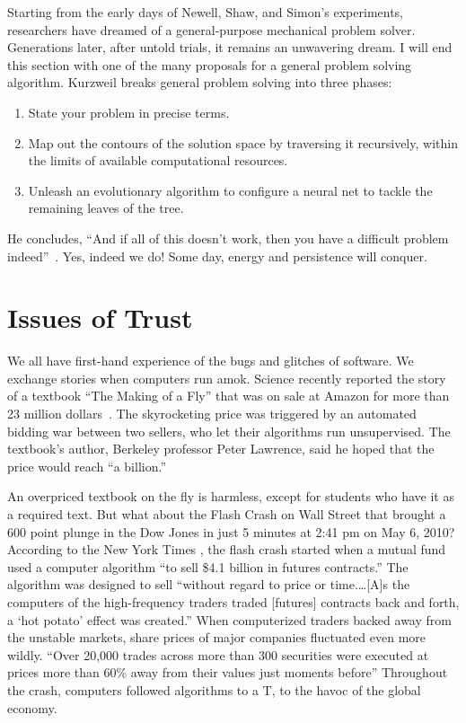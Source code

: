 \documentclass{llncs}
\begin{document}
\bigskip

Starting from the early days of Newell, Shaw, and Simon's experiments,
researchers have dreamed of a general-purpose mechanical problem
solver.  Generations later, after untold trials, it remains an
unwavering dream.  I will end this section with one of the many
proposals for a general problem solving algorithm.  Kurzweil breaks
general problem solving into three phases:
\begin{enumerate} 
\item State your problem in precise terms.
\item Map out the contours of the solution space by traversing it
  recursively, within the limits of available computational resources.
\item Unleash an evolutionary algorithm to configure a neural net to
  tackle the remaining leaves of the tree.
\end{enumerate}
He concludes, ``And if all of this doesn't work, then you have a
difficult problem indeed''~\cite{Ku99}.  Yes, indeed we do!  Some day,
energy and persistence will conquer.



\newpage
\section{Issues of Trust}\label{sec:trust}

We all have first-hand experience of the bugs and glitches of
software.  We exchange stories when computers run amok.  Science
recently reported the story of a textbook ``The Making of a Fly'' that
was on sale at Amazon for more than 23 million dollars~\cite{Sci11}.
The skyrocketing price was triggered by an automated bidding war
between two sellers, who let their algorithms run unsupervised.  The
textbook's author, Berkeley professor Peter Lawrence, said he hoped
that the price would reach ``a billion.''


An overpriced textbook on the fly is harmless, except for students who
have it as a required text.  But what about the Flash Crash on Wall
Street that brought a 600 point plunge in the Dow Jones in just 5
minutes at 2:41 pm on May 6, 2010?  According to the New York Times
\cite{NYT2010}, the flash crash started when a mutual fund used a
computer algorithm ``to sell \$4.1 billion in futures contracts.''
The algorithm was designed to sell ``without regard to price or
time.\dots [A]s the computers of the high-frequency traders traded
[futures] contracts back and forth, a `hot potato' effect was
created.''  When computerized traders backed away from the unstable
markets, share prices of major companies fluctuated even more
wildly. ``Over 20,000 trades across more than 300 securities were
executed at prices more than 60\% away from their values just moments
before'' \cite{SEC2010} Throughout the crash, computers followed
algorithms to a T, to the havoc of the global economy.
\end{document}
